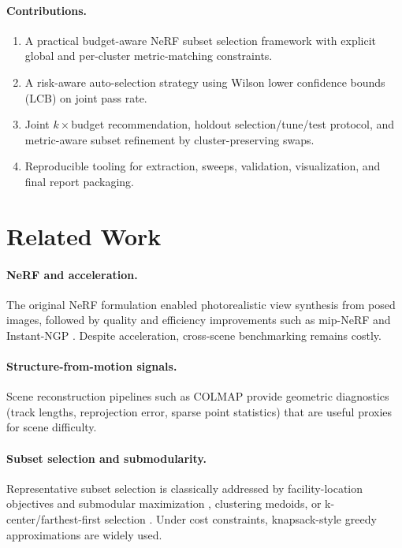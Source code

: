 \documentclass[10pt,twocolumn,letterpaper]{article}
\begin{document}
\paragraph{Contributions.}
\begin{enumerate}[leftmargin=*,itemsep=0pt]
\item A practical budget-aware NeRF subset selection framework with explicit global and per-cluster metric-matching constraints.
\item A risk-aware auto-selection strategy using Wilson lower confidence bounds (LCB) on joint pass rate.
\item Joint \(k\times\)budget recommendation, holdout selection/tune/test protocol, and metric-aware subset refinement by cluster-preserving swaps.
\item Reproducible tooling for extraction, sweeps, validation, visualization, and final report packaging.
\end{enumerate}

\section{Related Work}
\paragraph{NeRF and acceleration.}
The original NeRF formulation \cite{mildenhall2020nerf} enabled photorealistic view synthesis from posed images, followed by quality and efficiency improvements such as mip-NeRF \cite{barron2021mipnerf} and Instant-NGP \cite{muller2022instantngp}. Despite acceleration, cross-scene benchmarking remains costly.

\paragraph{Structure-from-motion signals.}
Scene reconstruction pipelines such as COLMAP \cite{schoenberger2016sfm,schoenberger2016mvs} provide geometric diagnostics (track lengths, reprojection error, sparse point statistics) that are useful proxies for scene difficulty.

\paragraph{Subset selection and submodularity.}
Representative subset selection is classically addressed by facility-location objectives and submodular maximization \cite{lin2011submodular,mirzasoleiman2015lazier}, clustering medoids, or k-center/farthest-first selection \cite{gonzalez1985kcenter}. Under cost constraints, knapsack-style greedy approximations are widely used.
\end{document}
